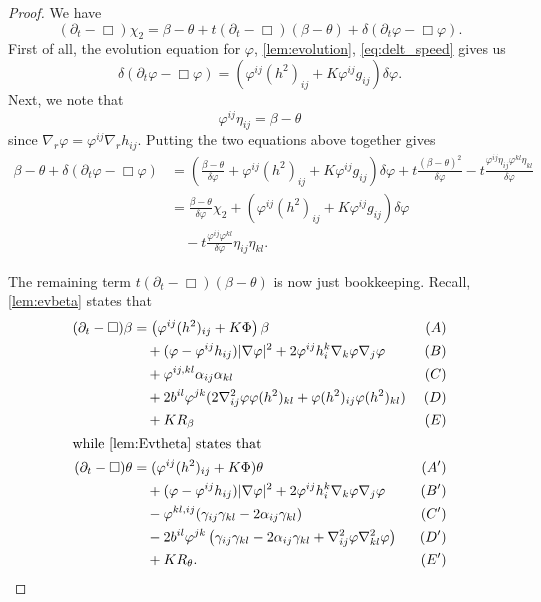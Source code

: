 \documentclass{amsart}
\begin{document}
\begin{proof}
We have
\[
(\partial_t - \Box)\chi_2 = \beta - \theta + t(\partial_{t} - \Box)(\beta - \theta) + \delta(\partial_t \varphi - \Box\varphi).
\]
First of all, the evolution equation for \(\varphi\), \cref{lem:evolution}, \cref{eq:delt_speed} gives us
\[
\delta(\partial_t \varphi - \Box\varphi) = \left(\varphi^{ij}(h^2)_{ij} + K\varphi^{ij}g_{ij}\right)\delta\varphi.
\]
Next, we note that
\[
\varphi^{ij} \eta_{ij} = \beta - \theta
\]
since \(\nabla_r \varphi = \varphi^{ij} \nabla_r h_{ij}\). Putting the two equations above together gives
\begin{equation}
\label{eq:deltchi1}
\begin{split}
\beta - \theta + \delta(\partial_t \varphi - \Box\varphi) &= \left(\frac{\beta-\theta}{\delta\varphi} + \varphi^{ij}(h^2)_{ij} + K\varphi^{ij}g_{ij}\right)\delta\varphi + t \frac{(\beta - \theta)^2}{\delta\varphi} - t \frac{\varphi^{ij}\eta_{ij} \varphi^{kl}\eta_{kl}}{\delta\varphi} \\
&= \frac{\beta-\theta}{\delta\varphi} \chi_2 + \left(\varphi^{ij}(h^2)_{ij} + K\varphi^{ij}g_{ij}\right)\delta\varphi \\
&\quad - t \frac{\varphi^{ij}\varphi^{kl}}{\delta\varphi} \eta_{ij}\eta_{kl}.
\end{split}
\end{equation}

The remaining term \(t(\partial_{t} - \Box)(\beta - \theta)\) is now just bookkeeping. Recall, \cref{lem:evbeta} states that
\begin{align*}
(\partial_{t} - \Box)\beta &= \left(\varphi^{ij}(h^2)_{ij} + K\Phi \right)\beta  & (A) \\
&\quad + (\varphi - \varphi^{ij}h_{ij}) |\nabla\varphi|^{2} + 2\varphi^{ij}h^{k}_{i}\nabla_k \varphi \nabla_j \varphi  & (B) \\
&\quad + \varphi^{ij,kl} \alpha_{ij} \alpha_{kl} & (C) \\
&\quad + 2b^{il}\varphi^{jk} (2\nabla^2_{ij}\varphi\varphi(h^2)_{kl} + \varphi(h^2)_{ij}\varphi(h^2)_{kl}) & (D) \\
&\quad + KR_{\beta}  & (E) \\
\intertext{while \cref{lem:Evtheta} states that}
(\partial_{t} - \Box)\theta &= (\varphi^{ij}(h^2)_{ij} + K\Phi)\theta & (A') \\
&\quad + (\varphi - \varphi^{ij}h_{ij})|\nabla\varphi|^{2} + 2\varphi^{ij}h^{k}_{i}\nabla_k\varphi\nabla_j\varphi & (B') \\
&\quad - \varphi^{kl,ij} (\gamma_{ij}\gamma_{kl}  - 2\alpha_{ij} \gamma_{kl}) & (C') \\
&\quad - 2b^{il} \varphi^{jk} \left(\gamma_{ij} \gamma_{kl} - 2\alpha_{ij} \gamma_{kl} + \nabla^2_{ij}\varphi\nabla^2_{kl}\varphi\right) & (D') \\
&\quad + KR_{\theta}. & (E')
\end{align*}


\end{proof}
\end{document}
